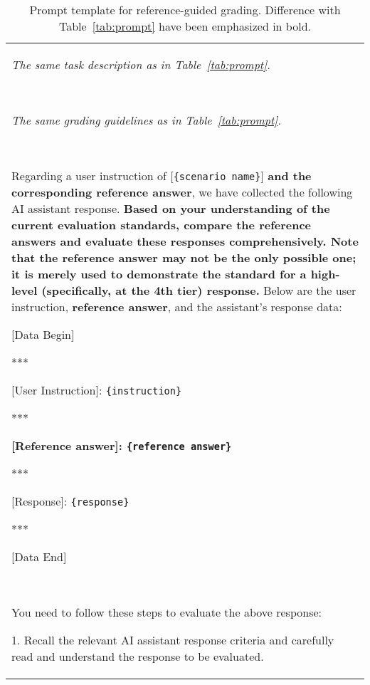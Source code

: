 


\begin{table*}[tbh!]
  \caption{Prompt template for reference-guided grading. Difference with Table~\ref{tab:prompt} have been emphasized in bold.}
  \label{tab:prompt-with-ref}
  \small
  \begin{tabularx}{\textwidth}{X}
    \toprule
        \emph{The same task description as in Table~\ref{tab:prompt}.}

        \ 
        
        \emph{The same grading guidelines as in Table~\ref{tab:prompt}.}
        
        \
        
        Regarding a user instruction of [\texttt{\{scenario name\}}] \textbf{and the corresponding reference answer}, we have collected the following AI assistant response. \textbf{Based on your understanding of the current evaluation standards, compare the reference answers and evaluate these responses comprehensively.  Note that the reference answer may not be the only possible one; it is merely used to demonstrate the standard for a high-level (specifically, at the 4th tier) response.} Below are the user instruction, \textbf{reference answer}, and the assistant's response data: 
        
        [Data Begin] 
        
        ***
        
        [User Instruction]: \texttt{\{instruction\}} 
        
        *** 

        \textbf{[Reference answer]: \texttt{\{reference answer\}}} 
        
        ***
        
        [Response]: \texttt{\{response\}}
        
        ***
        
        [Data End] 

        \
        
        You need to follow these steps to evaluate the above response: 
        
        1. Recall the relevant AI assistant response criteria and carefully read and understand the response to be evaluated.
        

\end{tabularx}
\end{table*}
